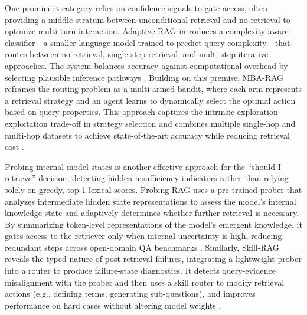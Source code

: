 \documentclass[11pt,a4paper]{article}
\begin{document}
One prominent category relies on confidence signals to gate access, often providing a middle stratum between unconditional retrieval and no-retrieval to optimize multi-turn interaction. Adaptive-RAG introduces a complexity-aware classifier---a smaller language model trained to predict query complexity---that routes between no-retrieval, single-step retrieval, and multi-step iterative approaches. The system balances accuracy against computational overhead by selecting plausible inference pathways \cite{arxiv:2403.14403v2}. Building on this premise, MBA-RAG reframes the routing problem as a multi-armed bandit, where each arm represents a retrieval strategy and an agent learns to dynamically select the optimal action based on query properties. This approach captures the intrinsic exploration-exploitation trade-off in strategy selection and combines multiple single-hop and multi-hop datasets to achieve state-of-the-art accuracy while reducing retrieval cost \cite{arxiv:2412.01572v4}.

Probing internal model states is another effective approach for the ``should I retrieve'' decision, detecting hidden insufficiency indicators rather than relying solely on greedy, top-1 lexical scores. Probing-RAG uses a pre-trained prober that analyzes intermediate hidden state representations to assess the model's internal knowledge state and adaptively determines whether further retrieval is necessary. By summarizing token-level representations of the model's emergent knowledge, it gates access to the retriever only when internal uncertainty is high, reducing redundant steps across open-domain QA benchmarks \cite{arxiv:2410.13339v2}. Similarly, Skill-RAG reveals the typed nature of post-retrieval failures, integrating a lightweight prober into a router to produce failure-state diagnostics. It detects query-evidence misalignment with the prober and then uses a skill router to modify retrieval actions (e.g., defining terms, generating sub-questions), and improves performance on hard cases without altering model weights \cite{arxiv:2604.15771v3}.
\end{document}
